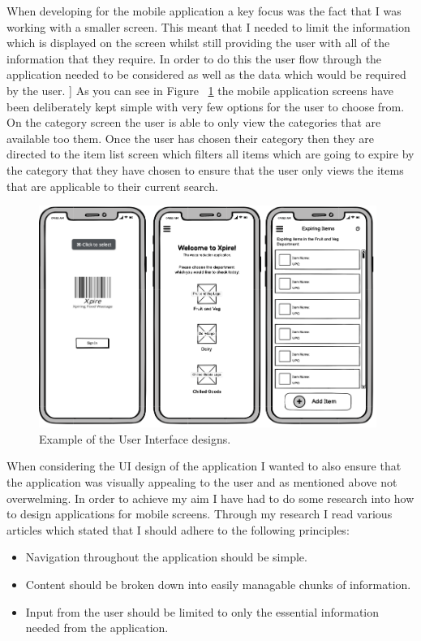 \documentclass[a4paper,11pt]{report}
\begin{document}
When developing for the mobile application a key focus was the fact that I was working with a smaller screen. This meant that I needed to limit the information which is displayed on the screen whilst still providing the user with all of the information that they require. In order to do this the user flow through the application needed to be considered as well as the data which would be required by the user. ]
As you can see in Figure ~\ref{fig:UIDesignExample} the mobile application screens have been deliberately kept simple with very few options for the user to choose from. On the category screen the user is able to only view the categories that are available too them. Once the user has chosen their category then they are directed to the item list screen which filters all items which are going to expire by the category that they have chosen to ensure that the user only views the items that are applicable to their current search.

\begin{figure}[H]
    \centering
    \includegraphics[width=11cm]{./assets/images/uiDesign-example.png}
    \caption{Example of the User Interface designs.}
    \label{fig:UIDesignExample}
\end{figure}

When considering the UI design of the application I wanted to also ensure that the application was visually appealing to the user and as mentioned above not overwelming. In order to achieve my aim I have had to do some research into how to design applications for mobile screens. Through my research I read various articles which stated that I should adhere to the following principles:

\begin{itemize}
    \item Navigation throughout the application should be simple.
    \item Content should be broken down into easily managable chunks of information.
    \item Input from the user should be limited to only the essential information needed from the application.
\end{itemize}
\end{document}
